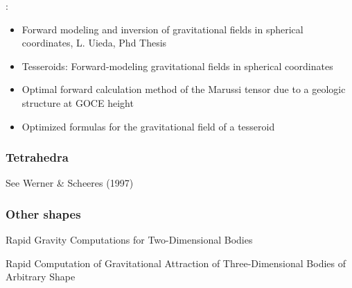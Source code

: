 \Literature:
\begin{itemize}
\item Forward modeling and inversion of gravitational fields in spherical coordinates, L. Uieda, Phd Thesis 
\cite{uied16}
\item Tesseroids: Forward-modeling gravitational fields in spherical coordinates \cite{uibb15}
\item Optimal forward calculation method of the Marussi tensor due to a geologic structure at GOCE height 
\cite{uibb11}
\item Optimized formulas for the gravitational field of a tesseroid \cite{grsh13}
\end{itemize}



\subsubsection{Tetrahedra}

See Werner \& Scheeres (1997) \cite{wesc97}



\subsubsection{Other shapes}

\Literature

Rapid Gravity Computations for Two-Dimensional Bodies \cite{tawl59}

Rapid Computation of Gravitational Attraction of Three-Dimensional Bodies of Arbitrary Shape
\cite{taew60}




